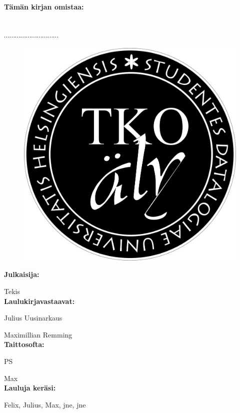 \noindent\textbf{Tämän kirjan omistaa:}
\\
\\
\\
$\cdots\cdots\cdots\cdots\cdots\cdots\cdots\cdots\cdots\cdots$
\\


\newpage

\begin{figure}[h!]
\centering
\includegraphics[scale=0.4]{graphics/logo.png}
\end{figure}

\cleardoublepage




\textbf{Julkaisija:}

Tekis
\\


\textbf{Laulukirjavastaavat:}

Julius Uusinarkaus

Maximillian Remming
\\

\textbf{Taittosofta:}

PS

Max
\\

\textbf{Lauluja keräsi:}

Felix, Julius, Max, jne, jne 
\\

